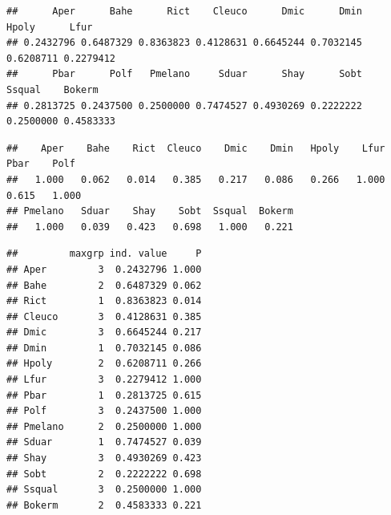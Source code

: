 \documentclass[
]{book}
\newenvironment{Shaded}{\begin{snugshade}}{\end{snugshade}}
\newcommand{\KeywordTok}[1]{\textcolor[rgb]{0.13,0.29,0.53}{\textbf{#1}}}
\newcommand{\NormalTok}[1]{#1}
\newcommand{\OperatorTok}[1]{\textcolor[rgb]{0.81,0.36,0.00}{\textbf{#1}}}
\newcommand{\StringTok}[1]{\textcolor[rgb]{0.31,0.60,0.02}{#1}}
\begin{document}
\begin{Shaded}
\end{Shaded}

\begin{verbatim}
##      Aper      Bahe      Rict    Cleuco      Dmic      Dmin     Hpoly      Lfur 
## 0.2432796 0.6487329 0.8363823 0.4128631 0.6645244 0.7032145 0.6208711 0.2279412 
##      Pbar      Polf   Pmelano     Sduar      Shay      Sobt    Ssqual    Bokerm 
## 0.2813725 0.2437500 0.2500000 0.7474527 0.4930269 0.2222222 0.2500000 0.4583333
\end{verbatim}

\begin{Shaded}
\end{Shaded}

\begin{verbatim}
##    Aper    Bahe    Rict  Cleuco    Dmic    Dmin   Hpoly    Lfur    Pbar    Polf 
##   1.000   0.062   0.014   0.385   0.217   0.086   0.266   1.000   0.615   1.000 
## Pmelano   Sduar    Shay    Sobt  Ssqual  Bokerm 
##   1.000   0.039   0.423   0.698   1.000   0.221
\end{verbatim}

\begin{Shaded}
\end{Shaded}

\begin{verbatim}
##         maxgrp ind. value     P
## Aper         3  0.2432796 1.000
## Bahe         2  0.6487329 0.062
## Rict         1  0.8363823 0.014
## Cleuco       3  0.4128631 0.385
## Dmic         3  0.6645244 0.217
## Dmin         1  0.7032145 0.086
## Hpoly        2  0.6208711 0.266
## Lfur         3  0.2279412 1.000
## Pbar         1  0.2813725 0.615
## Polf         3  0.2437500 1.000
## Pmelano      2  0.2500000 1.000
## Sduar        1  0.7474527 0.039
## Shay         3  0.4930269 0.423
## Sobt         2  0.2222222 0.698
## Ssqual       3  0.2500000 1.000
## Bokerm       2  0.4583333 0.221
\end{verbatim}
\end{document}
